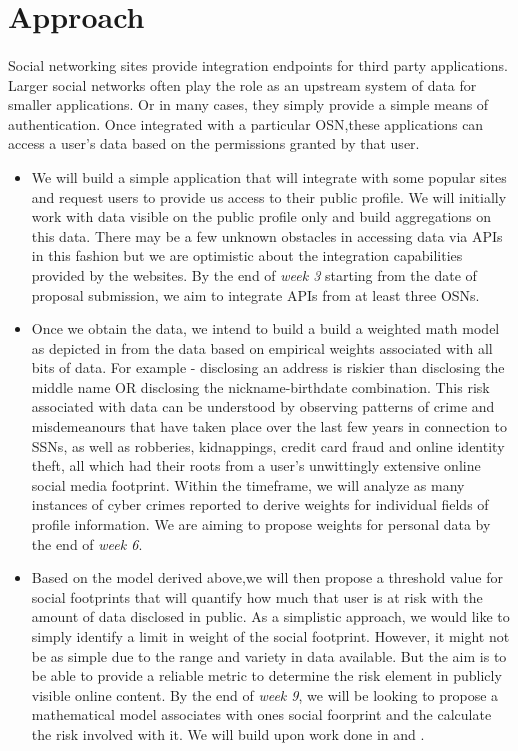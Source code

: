 \documentclass[11pt]{article}
\begin{document}
\section{Approach}
\paragraph{}
Social networking sites provide integration endpoints for third party applications. Larger social networks often play the role as an upstream system of data for smaller applications. Or in many cases, they simply provide a simple means of authentication. Once integrated with a particular OSN,these applications can access a user’s data based on the permissions granted by that user.
  \begin{itemize}
   \item We will build a simple application that will integrate with some popular sites and request users to provide us access to their public profile. We will initially work with data visible on the public profile only and build aggregations on this data. There may be a few unknown obstacles in accessing data via APIs in this fashion but we are optimistic about the integration capabilities provided by the websites. By the end of {\sl week 3} starting from the date of proposal submission, we aim to integrate APIs from at least three OSNs.
   \item Once we obtain the data, we intend to build a build a weighted math model as depicted in \cite{leakage} from the data based on empirical weights associated with all bits of data. For example - disclosing an address is riskier than disclosing the middle name OR disclosing the nickname-birthdate combination. This risk associated with data can be understood by observing patterns of crime and misdemeanours that have taken place over the last few years in connection to SSNs, as well as robberies, kidnappings, credit card fraud and online identity theft, all which had their roots from a user's unwittingly extensive online social media footprint. Within the timeframe, we will analyze as many instances of cyber crimes reported to derive weights for individual fields of profile information. We are aiming to propose weights for personal data by the end of {\sl week 6}.
   \item Based on the model derived above,we will then propose a threshold value for social footprints that will quantify how much that user is at risk with the amount of data disclosed in public. As a simplistic approach, we would like to simply identify a limit in weight of the social footprint. However, it might not be as simple due to the range and variety in data available. But the aim is to be able to provide a reliable metric to determine the risk element in publicly visible online content. By the end of {\sl week 9}, we will be looking to propose a mathematical model associates with ones social foorprint and the calculate the risk involved with it. We will build upon work done in \cite{pidx} and \cite{leakage}.

\end{itemize}
\end{document}
